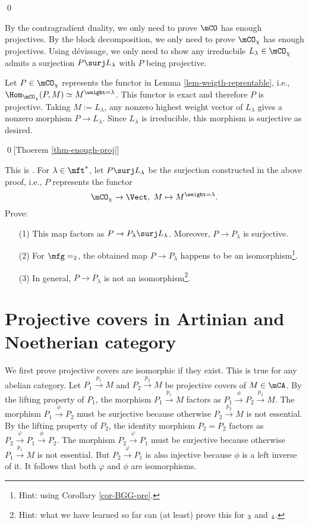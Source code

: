 	\qed

		By the contragradient duality, we only need to prove $\mCO$ has enough projectives. By the block decomposition, we only need to prove $\mCO_\chi$ has enough projectives. Using dévissage, we only need to show any irreducbile $L_\lambda\in \mCO_\chi$ admits a surjection $P\surj L_\lambda$ with $P$ being projective.

		Let $P\in \mCO_\chi$ represents the functor in Lemma \ref{lem-weigth-reprentable}, i.e., $\Hom_{\mCO_\chi}(P,M) \simeq M^{\weight = \lambda}$. This functor is exact and therefore $P$ is projective. Taking $M:= L_\lambda$, any nonzero highest weight vector of $L_\lambda$ gives a nonzero morphism $P\to L_\lambda$. Since $L_\lambda$ is irreducible, this morphism is surjective as desired.
		
	\qed[Thoerem \ref{thm-enough-proj}]

	\begin{exe}
		This is . For $\lambda\in \mft^*$, let $P\surj L_\lambda$ be the surjection constructed in the above proof, i.e., $P$ represents the functor
		\[
			\mCO_\chi \to \Vect,\; M \mapsto M^{\weight = \lambda}.
		\]
		Prove:
		\begin{itemize}
			\item[(1)]
				This map factors as $P \to P_\lambda \surj L_\lambda$. Moreover, $P\to P_\lambda$ is surjective.
			\item[(2)]
				For $\mfg=\sl_2$, the obtained map $P\to P_\lambda$ happens to be an isomorphism\footnote{Hint: using Corollary \ref{cor-BGG-pre}.}.
			\item[(3)]
				In general, $P\to P_\lambda$ is not an isomorphism\footnote{Hint: what we have learned so far can (at least) prove this for $\sl_3$ and $\sl_4$.}.
		\end{itemize}

	\end{exe}

\appendix
\section{Projective covers in Artinian and Noetherian category}


		We first prove projective covers are isomorphic if they exist. This is true for any abelian category. Let $P_1\xrightarrow{p_1} M$ and $P_2\xrightarrow{p_2} M$ be projective covers of $M\in\mCA$. By the lifting property of $P_1$, the morphism $P_1\xrightarrow{p_1} M$ factors as $P_1 \xrightarrow{\phi} P_2 \xrightarrow{p_2} M$. The morphism $P_1\xrightarrow{\phi} P_2$ must be surjective because otherwise $P_2\xrightarrow{p_2} M$ is not essential. By the lifting property of $P_2$, the identity morphism $P_2 = P_2$ factors as $P_2 \xrightarrow{\varphi} P_1 \xrightarrow{\phi} P_2$. The morphism $P_2 \xrightarrow{\varphi} P_1 $ must be surjective because otherwise $P_1\xrightarrow{p_1} M$ is not essential. But $P_2 \xrightarrow{\varphi} P_1 $ is also injective because $\phi$ is a left inverse of it. It follows that both $\varphi$ and $\phi$ are isomorphisms.


